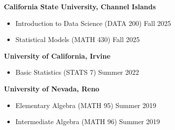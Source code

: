 \documentclass{article}
\begin{document}
	
	\begin{description}
		\vspace{-2mm}
		\item[Teaching Experience]\hspace*{.1in} 
		
		\textbf{California State University, Channel Islands}
		\begin{itemize}
			\item Introduction to Data Science (DATA 200) \hfill{Fall 2025}
			\item Statistical Models (MATH 430) \hfill{Fall 2025}
		\end{itemize}
		
		\textbf{University of California, Irvine}
		\begin{itemize}
			\item Basic Statistics (STATS 7) \hfill{Summer 2022}
		\end{itemize}
		
		\textbf{University of Nevada, Reno}
		\begin{itemize}
			\item Elementary Algebra (MATH 95) \hfill{Summer 2019}
			
			\item Intermediate Algebra (MATH 96) \hfill{Summer 2019}
		\end{itemize}			
		
%		
%			
%			
%			
%			
%			
		
	\end{description}
\end{document}

